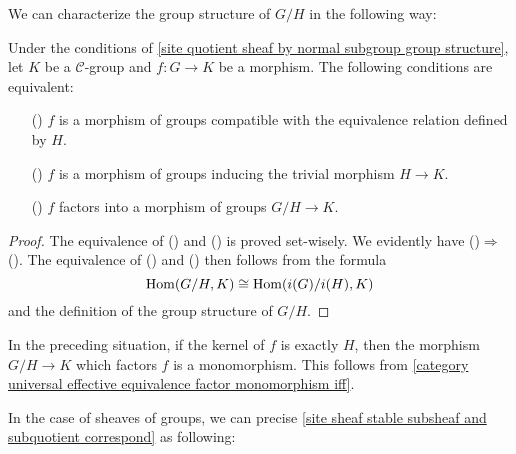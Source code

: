 We can characterize the group structure of $G/H$ in the following way:
\begin{proposition}\label{site quotient by normal subgroup universal prop}
Under the conditions of \cref{site quotient sheaf by normal subgroup group structure}, let $K$ be a $\mathcal{C}$-group and $f:G\to K$ be a morphism. The following conditions are equivalent:
\begin{enumerate}
    \item[(\rmnum{1})] $f$ is a morphism of groups compatible with the equivalence relation defined by $H$.
    \item[(\rmnum{2})] $f$ is a morphism of groups inducing the trivial morphism $H\to K$.
    \item[(\rmnum{3})] $f$ factors into a morphism of groups $G/H\to K$.
\end{enumerate}
\end{proposition}
\begin{proof}
The equivalence of () and () is proved set-wisely. We evidently have ()$\Rightarrow$(). The equivalence of () and () then follows from the formula
\[\mathrm{Hom}(G/H,K)\cong\mathrm{Hom}(i(G)/i(H),K)\]
and the definition of the group structure of $G/H$.
\end{proof}

\begin{remark}
In the preceding situation, if the kernel of $f$ is exactly $H$, then the morphism $G/H\to K$ which factors $f$ is a monomorphism. This follows from \cref{category universal effective equivalence factor monomorphism iff}.
\end{remark}

In the case of sheaves of groups, we can precise \cref{site sheaf stable subsheaf and subquotient correspond} as following:

